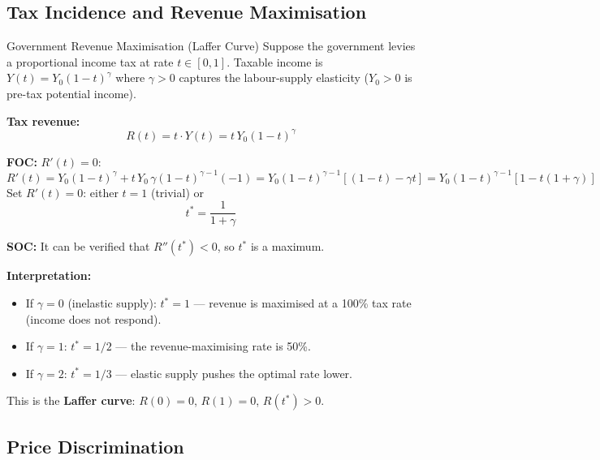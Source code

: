 \documentclass[12pt, a4paper]{article}
\theoremstyle{definition}
\begin{document}
\subsection{Tax Incidence and Revenue Maximisation}

\begin{exbox}{Government Revenue Maximisation (Laffer Curve)}
Suppose the government levies a proportional income tax at rate $t \in [0,1]$.
Taxable income is $Y(t) = Y_0(1-t)^\gamma$ where $\gamma > 0$ captures the
labour-supply elasticity ($Y_0 > 0$ is pre-tax potential income).

\textbf{Tax revenue:}
\[
  R(t) = t \cdot Y(t) = t\,Y_0(1-t)^\gamma
\]

\textbf{FOC:} $R'(t) = 0$:
\[
  R'(t) = Y_0(1-t)^\gamma + t\,Y_0\,\gamma(1-t)^{\gamma-1}(-1)
         = Y_0(1-t)^{\gamma-1}[(1-t) - \gamma t]
         = Y_0(1-t)^{\gamma-1}[1-t(1+\gamma)]
\]
Set $R'(t)=0$: either $t=1$ (trivial) or
\[
  \boxed{t^* = \frac{1}{1+\gamma}}
\]

\textbf{SOC:} It can be verified that $R''(t^*)<0$, so $t^*$ is a maximum.

\textbf{Interpretation:}
\begin{itemize}
  \item If $\gamma=0$ (inelastic supply): $t^*=1$ --- revenue is maximised
        at a 100\% tax rate (income does not respond).
  \item If $\gamma=1$: $t^*=1/2$ --- the revenue-maximising rate is 50\%.
  \item If $\gamma=2$: $t^*=1/3$ --- elastic supply pushes the optimal rate
        lower.
\end{itemize}
This is the \textbf{Laffer curve}: $R(0)=0$, $R(1)=0$, $R(t^*)>0$.
\end{exbox}

\subsection{Price Discrimination}
\end{document}
